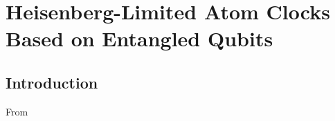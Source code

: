 \chapter{Heisenberg-Limited Atom Clocks Based on Entangled Qubits}
\label{ch:Kessler2014}

\section{Introduction} 
From \cite{Kessler2014}